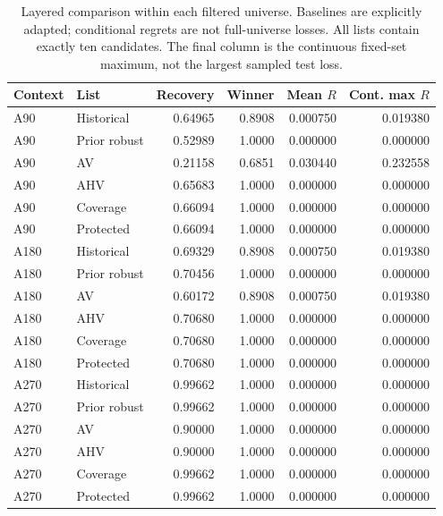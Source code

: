 \begin{table}[tbp]\centering\small\caption{Layered comparison within each filtered universe. Baselines are explicitly adapted; conditional regrets are not full-universe losses. All lists contain exactly ten candidates. The final column is the continuous fixed-set maximum, not the largest sampled test loss.}\label{tab:comparison2}
\begin{tabular}{llrrrr}\toprule
Context & List & Recovery & Winner & Mean $R$ & Cont. max $R$\\\midrule
A90 & Historical & 0.64965 & 0.8908 & 0.000750 & 0.019380\\
A90 & Prior robust & 0.52989 & 1.0000 & 0.000000 & 0.000000\\
A90 & AV & 0.21158 & 0.6851 & 0.030440 & 0.232558\\
A90 & AHV & 0.65683 & 1.0000 & 0.000000 & 0.000000\\
A90 & Coverage & 0.66094 & 1.0000 & 0.000000 & 0.000000\\
A90 & Protected & 0.66094 & 1.0000 & 0.000000 & 0.000000\\
A180 & Historical & 0.69329 & 0.8908 & 0.000750 & 0.019380\\
A180 & Prior robust & 0.70456 & 1.0000 & 0.000000 & 0.000000\\
A180 & AV & 0.60172 & 0.8908 & 0.000750 & 0.019380\\
A180 & AHV & 0.70680 & 1.0000 & 0.000000 & 0.000000\\
A180 & Coverage & 0.70680 & 1.0000 & 0.000000 & 0.000000\\
A180 & Protected & 0.70680 & 1.0000 & 0.000000 & 0.000000\\
A270 & Historical & 0.99662 & 1.0000 & 0.000000 & 0.000000\\
A270 & Prior robust & 0.99662 & 1.0000 & 0.000000 & 0.000000\\
A270 & AV & 0.90000 & 1.0000 & 0.000000 & 0.000000\\
A270 & AHV & 0.90000 & 1.0000 & 0.000000 & 0.000000\\
A270 & Coverage & 0.99662 & 1.0000 & 0.000000 & 0.000000\\
A270 & Protected & 0.99662 & 1.0000 & 0.000000 & 0.000000\\
\bottomrule\end{tabular}\end{table}
